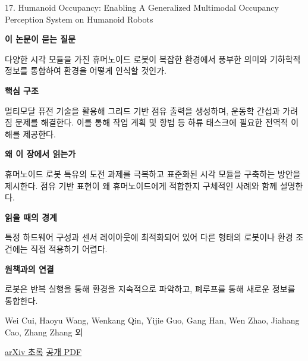 \documentclass[11pt,openany]{book}
\begin{document}
\begin{termcard}{17. Humanoid Occupancy: Enabling A Generalized Multimodal Occupancy Perception System on Humanoid Robots}

\par

\medskip

{\sffamily\bfseries\color{deepblue} 이 논문이 묻는 질문}\par

다양한 시각 모듈을 가진 휴머노이드 로봇이 복잡한 환경에서 풍부한 의미와 기하학적 정보를 통합하여 환경을 어떻게 인식할 것인가.

\smallskip

{\sffamily\bfseries\color{deepblue} 핵심 구조}\par

멀티모달 퓨전 기술을 활용해 그리드 기반 점유 출력을 생성하며, 운동학 간섭과 가려짐 문제를 해결한다. 이를 통해 작업 계획 및 항법 등 하류 태스크에 필요한 전역적 이해를 제공한다.

\smallskip

{\sffamily\bfseries\color{deepblue} 왜 이 장에서 읽는가}\par

휴머노이드 로봇 특유의 도전 과제를 극복하고 표준화된 시각 모듈을 구축하는 방안을 제시한다. 점유 기반 표현이 왜 휴머노이드에게 적합한지 구체적인 사례와 함께 설명한다.

\smallskip

{\sffamily\bfseries\color{coral} 읽을 때의 경계}\par

특정 하드웨어 구성과 센서 레이아웃에 최적화되어 있어 다른 형태의 로봇이나 환경 조건에는 직접 적용하기 어렵다.

\smallskip

{\sffamily\bfseries\color{teal} 원책과의 연결}\par

로봇은 반복 실행을 통해 환경을 지속적으로 파악하고, 폐루프를 통해 새로운 정보를 통합한다.

\medskip

{\footnotesize\color{muted} Wei Cui, Haoyu Wang, Wenkang Qin, Yijie Guo, Gang Han, Wen Zhao, Jiahang Cao, Zhang Zhang 외\par

\href{https://arxiv.org/abs/2507.20217}{arXiv 초록} \quad \href{https://arxiv.org/pdf/2507.20217}{공개 PDF}\par}

\end{termcard}
\end{document}
